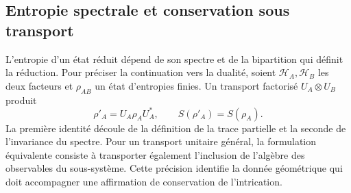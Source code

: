\subsection{Entropie spectrale et conservation sous transport}
\label{v:v:ant:sec:biparticion-transporte}

L’entropie d’un état réduit dépend de son spectre et de la
bipartition qui définit la réduction. Pour préciser la continuation
vers la dualité, soient \(\mathcal H_A,\mathcal H_B\) les deux facteurs
et \(\rho_{AB}\) un état d’entropies finies. Un transport
factorisé \(U_A\otimes U_B\) produit
\[
 \rho'_A=U_A\rho_AU_A^*,\qquad S(\rho'_A)=S(\rho_A).
\]
La première identité découle de la définition de la trace partielle et la
seconde de l’invariance du spectre. Pour un transport unitaire
général, la formulation équivalente consiste à transporter également
l’inclusion de l’algèbre des observables du sous-système. Cette précision
identifie la donnée géométrique qui doit accompagner une affirmation
de conservation de l’intrication.
